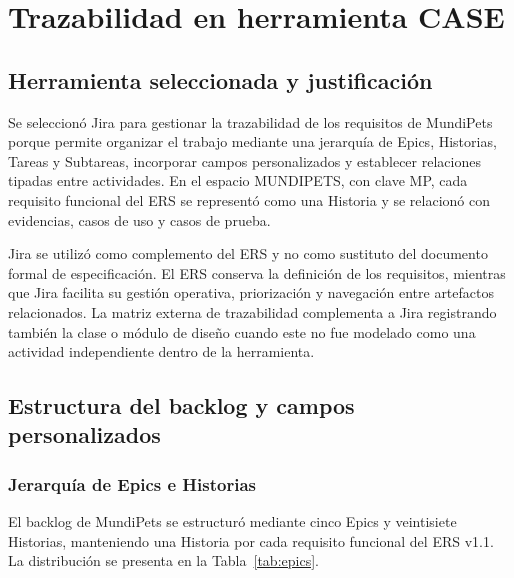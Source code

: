 \documentclass[journal,onecolumn]{IEEEtran}
\begin{document}
	
	\newpage
	
	\section{Trazabilidad en herramienta CASE}
	
	\subsection{Herramienta seleccionada y justificación}
	
	Se seleccionó Jira para gestionar la trazabilidad de los requisitos de MundiPets porque permite organizar el trabajo mediante una jerarquía de Epics, Historias, Tareas y Subtareas, incorporar campos personalizados y establecer relaciones tipadas entre actividades. En el espacio MUNDIPETS, con clave MP, cada requisito funcional del ERS se representó como una Historia y se relacionó con evidencias, casos de uso y casos de prueba.
	
	Jira se utilizó como complemento del ERS y no como sustituto del documento formal de especificación. El ERS conserva la definición de los requisitos, mientras que Jira facilita su gestión operativa, priorización y navegación entre artefactos relacionados. La matriz externa de trazabilidad complementa a Jira registrando también la clase o módulo de diseño cuando este no fue modelado como una actividad independiente dentro de la herramienta.
	
	\subsection{Estructura del backlog y campos personalizados}
	
	\subsubsection{Jerarquía de Epics e Historias}
	
	El backlog de MundiPets se estructuró mediante cinco Epics y veintisiete Historias, manteniendo una Historia por cada requisito funcional del ERS v1.1. La distribución se presenta en la Tabla~\ref{tab:epics}.
	
\end{document}
